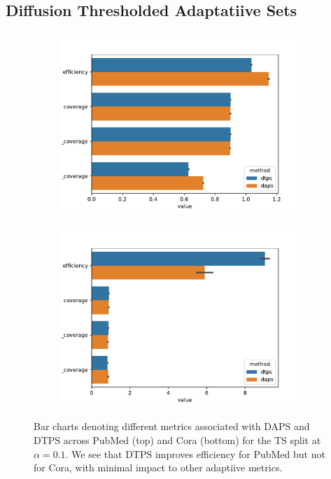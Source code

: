\subsection{Diffusion Thresholded Adaptatiive Sets}
\begin{figure}
    \centering
    \begin{subfigure}{0.7\linewidth}
        \includegraphics[width=\linewidth]{graphConformal/figures/split/daps_dtps_pubmed}
    \end{subfigure}
    \begin{subfigure}{0.7\linewidth}
        \includegraphics[width=\linewidth]{graphConformal/figures/split/daps_dtps_cora}
    \end{subfigure}
    \caption{Bar charts denoting different metrics associated with DAPS and DTPS across PubMed (top) and Cora (bottom) for the TS split at $\alpha=0.1$. We see that DTPS improves efficiency for PubMed but not for Cora, with minimal impact to other adaptiive metrics.}
    \label{fig:fs:conformal:daps_vs_dtps}
\end{figure}


